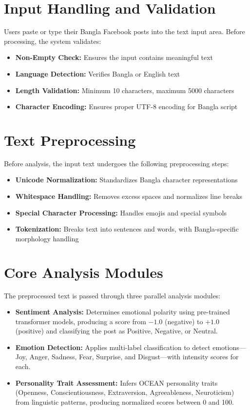 \documentclass[12pt,a4paper]{report}
\begin{document}
\begin{itemize}
\section{Input Handling and Validation}

Users paste or type their Bangla Facebook posts into the text input area. Before processing, the system validates:

\begin{itemize}
    \item \textbf{Non-Empty Check:} Ensures the input contains meaningful text
    \item \textbf{Language Detection:} Verifies Bangla or English text
    \item \textbf{Length Validation:} Minimum 10 characters, maximum 5000 characters
    \item \textbf{Character Encoding:} Ensures proper UTF-8 encoding for Bangla script
\end{itemize}

\section{Text Preprocessing}

Before analysis, the input text undergoes the following preprocessing steps:

\begin{itemize}
    \item \textbf{Unicode Normalization:} Standardizes Bangla character representations
    \item \textbf{Whitespace Handling:} Removes excess spaces and normalizes line breaks
    \item \textbf{Special Character Processing:} Handles emojis and special symbols
    \item \textbf{Tokenization:} Breaks text into sentences and words, with Bangla-specific morphology handling
\end{itemize}

\section{Core Analysis Modules}

The preprocessed text is passed through three parallel analysis modules:

\begin{itemize}
    \item \textbf{Sentiment Analysis:} Determines emotional polarity using pre-trained transformer models, producing a score from $-1.0$ (negative) to $+1.0$ (positive) and classifying the post as Positive, Negative, or Neutral.
    \item \textbf{Emotion Detection:} Applies multi-label classification to detect emotions---Joy, Anger, Sadness, Fear, Surprise, and Disgust---with intensity scores for each.
    \item \textbf{Personality Trait Assessment:} Infers OCEAN personality traits (Openness, Conscientiousness, Extraversion, Agreeableness, Neuroticism) from linguistic patterns, producing normalized scores between 0 and 100.
\end{itemize}


\end{itemize}
\end{document}
